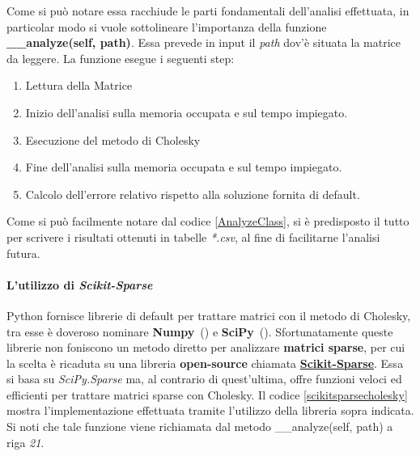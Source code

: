 

Come si può notare essa racchiude le parti fondamentali dell'analisi effettuata, in particolar modo si vuole sottolineare l'importanza della funzione \textbf{\_\_analyze(self, path)}. Essa prevede in input il \textit{path} dov'è situata la matrice da leggere. La funzione esegue i seguenti step:
\begin{enumerate}
    \item Lettura della Matrice
    \item Inizio dell'analisi sulla memoria occupata e sul tempo impiegato.
    \item Esecuzione del metodo di Cholesky
    \item Fine dell'analisi sulla memoria occupata e sul tempo impiegato.
    \item Calcolo dell'errore relativo rispetto alla soluzione fornita di default.
\end{enumerate}
Come si può facilmente notare dal codice \ref{AnalyzeClass}, si è predisposto il tutto per scrivere i risultati ottenuti in tabelle \textit{*.csv}, al fine di facilitarne l'analisi futura.

\paragraph{L'utilizzo di \textit{Scikit-Sparse}}
Python fornisce librerie di default per trattare matrici con il metodo di Cholesky, tra esse è doveroso nominare \textbf{Numpy}~(\cite{harris2020array}) e \textbf{SciPy}~(\cite{2020SciPy-NMeth}). Sfortunatamente queste librerie non foniscono un metodo diretto per analizzare \textbf{matrici sparse}, per cui la scelta è ricaduta su una libreria \textbf{open-source} chiamata \textbf{\href{https://scikit-sparse.readthedocs.io/en/latest/}{Scikit-Sparse}}. Essa si basa su \textit{SciPy.Sparse} ma, al contrario di quest'ultima, offre funzioni veloci ed efficienti per trattare matrici sparse con Cholesky. Il codice \ref{scikitsparsecholesky} mostra l'implementazione effettuata tramite l'utilizzo della libreria sopra indicata. Si noti che tale funzione viene richiamata dal metodo \_\_analyze(self, path) a riga \textit{21}.



